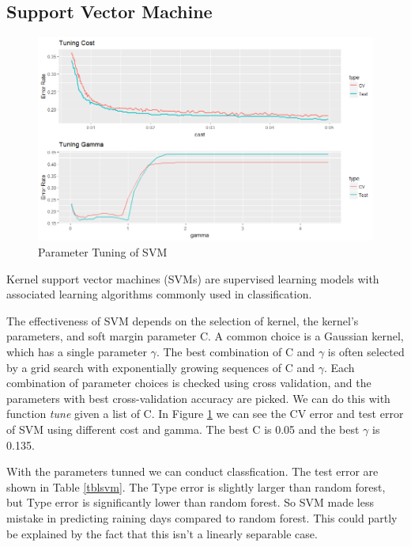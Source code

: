 \subsection{Support Vector Machine}

\begin{figure}[h]
\center\includegraphics[width = .8\textwidth]{svm.png}
\caption{Parameter Tuning of SVM}
\label{svm}
\end{figure}

Kernel support vector machines (SVMs) are supervised learning models with associated learning algorithms commonly used in classification.\cite{cristianini2000introduction}

The effectiveness of SVM depends on the selection of kernel, the kernel's parameters, and soft margin parameter C. A common choice is a Gaussian kernel, which has a single parameter $\gamma$. The best combination of C and $\gamma$ is often selected by a grid search with exponentially growing sequences of C and $\gamma$. Each combination of parameter choices is checked using cross validation, and the parameters with best cross-validation accuracy are picked. We can do this with function \emph{tune} given a list of C. In Figure \ref{svm} we can see the CV error and test error of SVM using different cost and gamma. The best C is 0.05 and the best $\gamma$ is 0.135.

With the parameters tunned we can conduct classfication. The test error are shown in Table \ref{tblsvm}. The Type \uppercase\expandafter{} error is slightly larger than random forest, but Type \uppercase\expandafter{} error is significantly lower than random forest. So SVM made less mistake in predicting raining days compared to random forest. This could partly be explained by the fact that this isn't a linearly separable case. 


